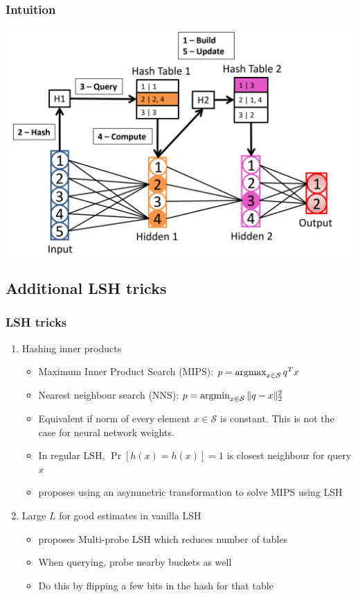 \documentclass{beamer}
\begin{document}
\begin{frame}
    \frametitle{Intuition}
    \centering
    \includegraphics[width=\textwidth]{images/intuition.png}
    

\end{frame}
\subsection{Additional LSH tricks}
\begin{frame}
    \frametitle{LSH tricks}
    \begin{enumerate}
        \item Hashing inner products 
        \begin{itemize}
            \item Maximum Inner Product Search (MIPS): $p = \operatorname*{\arg\!\max}_{x\in \mathcal{S}}q^{T}x$
            \item Nearest neighbour search (NNS): $p=\operatorname*{\arg\!\min}_{x\in \mathcal{S}}\|q-x\|_{2}^{2}$
            \item Equivalent if norm of every element $x\in \mathcal{S}$ is constant. This is not the case for neural network weights.
            \item In regular LSH, $\operatorname{Pr}[h(x)=h(x)]=1$ is closest neighbour for query $x$
            \item \cite{shrivastava2014asymmetric} proposes using an asymmetric transformation to solve MIPS using LSH
        \end{itemize}
        \item Large $L$ for good estimates in vanilla LSH
        \begin{itemize}
            \item \cite{lv2007multi} proposes Multi-probe LSH which  reduces number of tables
            \item When querying, probe nearby buckets as well
            \item Do this by flipping a few bits in the hash for that table 
        \end{itemize}
    \end{enumerate}
\end{frame}
\end{document}
